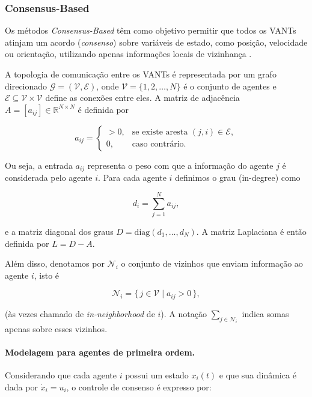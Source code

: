 \subsubsection{Consensus-Based}

Os métodos \textit{Consensus-Based} têm como objetivo permitir que todos os VANTs atinjam um acordo (\textit{consenso}) sobre variáveis de estado, como posição, velocidade ou orientação, utilizando apenas informações locais de vizinhança \citep{bu2024advancement, ouyang2023formation, olfati2007consensus, ren2008distributed}. 

A topologia de comunicação entre os VANTs é representada por um grafo direcionado \(\mathcal{G} = (\mathcal{V}, \mathcal{E})\), onde \(\mathcal{V} = \{1, 2, \dots, N\}\) é o conjunto de agentes e \(\mathcal{E} \subseteq \mathcal{V} \times \mathcal{V}\) define as conexões entre eles.  
A matriz de adjacência \(A = [a_{ij}]\in\mathbb{R}^{N\times N}\) é definida por

\begin{equation}
a_{ij} =
\begin{cases}
>0, & \text{se existe aresta }(j,i)\in\mathcal{E},\\[4pt]
0,  & \text{caso contrário.}
\end{cases}
\end{equation}


Ou seja, a entrada \(a_{ij}\) representa o peso com que a informação do agente \(j\) é considerada pelo agente \(i\). Para cada agente \(i\) definimos o grau (in-degree) como

\begin{equation}
d_i = \sum_{j=1}^{N} a_{ij},
\end{equation}

e a matriz diagonal dos graus \(D=\mathrm{diag}(d_1,\dots,d_N)\). A matriz Laplaciana é então definida por \(L = D - A\).

Além disso, denotamos por \(\mathcal{N}_i\) o conjunto de vizinhos que enviam informação ao agente \(i\), isto é

\begin{equation}
\mathcal{N}_i = \{\, j \in \mathcal{V} \mid a_{ij} > 0 \,\},
\end{equation}

(às vezes chamado de \emph{in-neighborhood} de \(i\)). A notação \(\sum_{j\in\mathcal{N}_i}\) indica somas apenas sobre esses vizinhos.

\paragraph{Modelagem para agentes de primeira ordem.}
Considerando que cada agente \(i\) possui um estado \(x_i(t)\) e que sua dinâmica é dada por \(\dot{x}_i = u_i\), o controle de consenso é expresso por:

